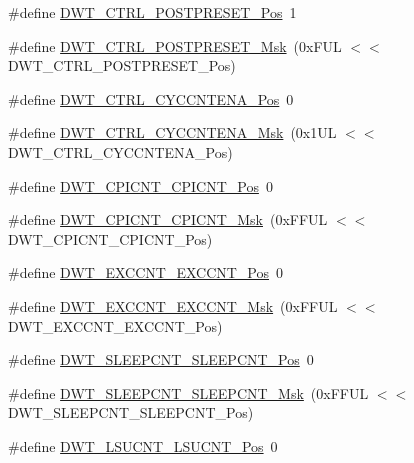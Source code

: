 \begin{DoxyCompactItemize}
\item 
\#define \hyperlink{group___c_m_s_i_s___d_w_t_ga129bc152febfddd67a0c20c6814cba69}{D\+W\+T\+\_\+\+C\+T\+R\+L\+\_\+\+P\+O\+S\+T\+P\+R\+E\+S\+E\+T\+\_\+\+Pos}~1
\item 
\#define \hyperlink{group___c_m_s_i_s___d_w_t_ga11d9e1e2a758fdd2657aa68ce61b9c9d}{D\+W\+T\+\_\+\+C\+T\+R\+L\+\_\+\+P\+O\+S\+T\+P\+R\+E\+S\+E\+T\+\_\+\+Msk}~(0x\+F\+U\+L $<$$<$ D\+W\+T\+\_\+\+C\+T\+R\+L\+\_\+\+P\+O\+S\+T\+P\+R\+E\+S\+E\+T\+\_\+\+Pos)
\item 
\#define \hyperlink{group___c_m_s_i_s___d_w_t_gaa4509f5f8514a7200be61691f0e01f10}{D\+W\+T\+\_\+\+C\+T\+R\+L\+\_\+\+C\+Y\+C\+C\+N\+T\+E\+N\+A\+\_\+\+Pos}~0
\item 
\#define \hyperlink{group___c_m_s_i_s___d_w_t_ga4a9d209dc2a81ea6bfa0ea21331769d3}{D\+W\+T\+\_\+\+C\+T\+R\+L\+\_\+\+C\+Y\+C\+C\+N\+T\+E\+N\+A\+\_\+\+Msk}~(0x1\+U\+L $<$$<$ D\+W\+T\+\_\+\+C\+T\+R\+L\+\_\+\+C\+Y\+C\+C\+N\+T\+E\+N\+A\+\_\+\+Pos)
\item 
\#define \hyperlink{group___c_m_s_i_s___d_w_t_ga80e9ad8f6a9e2344af8a3cf989bebe3d}{D\+W\+T\+\_\+\+C\+P\+I\+C\+N\+T\+\_\+\+C\+P\+I\+C\+N\+T\+\_\+\+Pos}~0
\item 
\#define \hyperlink{group___c_m_s_i_s___d_w_t_ga76f39e7bca3fa86a4dbf7b8f6adb7217}{D\+W\+T\+\_\+\+C\+P\+I\+C\+N\+T\+\_\+\+C\+P\+I\+C\+N\+T\+\_\+\+Msk}~(0x\+F\+F\+U\+L $<$$<$ D\+W\+T\+\_\+\+C\+P\+I\+C\+N\+T\+\_\+\+C\+P\+I\+C\+N\+T\+\_\+\+Pos)
\item 
\#define \hyperlink{group___c_m_s_i_s___d_w_t_ga031c693654030d4cba398b45d2925b1d}{D\+W\+T\+\_\+\+E\+X\+C\+C\+N\+T\+\_\+\+E\+X\+C\+C\+N\+T\+\_\+\+Pos}~0
\item 
\#define \hyperlink{group___c_m_s_i_s___d_w_t_ga057fa604a107b58a198bbbadb47e69c9}{D\+W\+T\+\_\+\+E\+X\+C\+C\+N\+T\+\_\+\+E\+X\+C\+C\+N\+T\+\_\+\+Msk}~(0x\+F\+F\+U\+L $<$$<$ D\+W\+T\+\_\+\+E\+X\+C\+C\+N\+T\+\_\+\+E\+X\+C\+C\+N\+T\+\_\+\+Pos)
\item 
\#define \hyperlink{group___c_m_s_i_s___d_w_t_ga0371a84a7996dc5852c56afb2676ba1c}{D\+W\+T\+\_\+\+S\+L\+E\+E\+P\+C\+N\+T\+\_\+\+S\+L\+E\+E\+P\+C\+N\+T\+\_\+\+Pos}~0
\item 
\#define \hyperlink{group___c_m_s_i_s___d_w_t_ga1e340751d71413fef400a0a1d76cc828}{D\+W\+T\+\_\+\+S\+L\+E\+E\+P\+C\+N\+T\+\_\+\+S\+L\+E\+E\+P\+C\+N\+T\+\_\+\+Msk}~(0x\+F\+F\+U\+L $<$$<$ D\+W\+T\+\_\+\+S\+L\+E\+E\+P\+C\+N\+T\+\_\+\+S\+L\+E\+E\+P\+C\+N\+T\+\_\+\+Pos)
\item 
\#define \hyperlink{group___c_m_s_i_s___d_w_t_gab9394c7911b0b4312a096dad91d53a3d}{D\+W\+T\+\_\+\+L\+S\+U\+C\+N\+T\+\_\+\+L\+S\+U\+C\+N\+T\+\_\+\+Pos}~0
$$
\end{DoxyCompactItemize}
